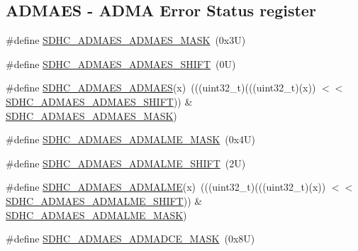 \subsection*{A\+D\+M\+A\+ES -\/ A\+D\+MA Error Status register}
\begin{DoxyCompactItemize}
\item 
\#define \mbox{\hyperlink{group___s_d_h_c___register___masks_gaaf2deb9a73e0aeecdc0ee08497d0165b}{S\+D\+H\+C\+\_\+\+A\+D\+M\+A\+E\+S\+\_\+\+A\+D\+M\+A\+E\+S\+\_\+\+M\+A\+SK}}~(0x3\+U)
\item 
\#define \mbox{\hyperlink{group___s_d_h_c___register___masks_ga3cc649f6ebd779dc84337a9bc5ae5c0d}{S\+D\+H\+C\+\_\+\+A\+D\+M\+A\+E\+S\+\_\+\+A\+D\+M\+A\+E\+S\+\_\+\+S\+H\+I\+FT}}~(0\+U)
\item 
\#define \mbox{\hyperlink{group___s_d_h_c___register___masks_gae961b07d5069efed1d1529e087caab7c}{S\+D\+H\+C\+\_\+\+A\+D\+M\+A\+E\+S\+\_\+\+A\+D\+M\+A\+ES}}(x)~(((uint32\+\_\+t)(((uint32\+\_\+t)(x)) $<$$<$ \mbox{\hyperlink{group___s_d_h_c___register___masks_ga3cc649f6ebd779dc84337a9bc5ae5c0d}{S\+D\+H\+C\+\_\+\+A\+D\+M\+A\+E\+S\+\_\+\+A\+D\+M\+A\+E\+S\+\_\+\+S\+H\+I\+FT}})) \& \mbox{\hyperlink{group___s_d_h_c___register___masks_gaaf2deb9a73e0aeecdc0ee08497d0165b}{S\+D\+H\+C\+\_\+\+A\+D\+M\+A\+E\+S\+\_\+\+A\+D\+M\+A\+E\+S\+\_\+\+M\+A\+SK}})
\item 
\#define \mbox{\hyperlink{group___s_d_h_c___register___masks_ga12cecea9616404f0ae9cae658e7c8849}{S\+D\+H\+C\+\_\+\+A\+D\+M\+A\+E\+S\+\_\+\+A\+D\+M\+A\+L\+M\+E\+\_\+\+M\+A\+SK}}~(0x4\+U)
\item 
\#define \mbox{\hyperlink{group___s_d_h_c___register___masks_ga75e811daac256a56735bf2a822440434}{S\+D\+H\+C\+\_\+\+A\+D\+M\+A\+E\+S\+\_\+\+A\+D\+M\+A\+L\+M\+E\+\_\+\+S\+H\+I\+FT}}~(2\+U)
\item 
\#define \mbox{\hyperlink{group___s_d_h_c___register___masks_ga401fe1b22794745f8c4e9ec0ee57560d}{S\+D\+H\+C\+\_\+\+A\+D\+M\+A\+E\+S\+\_\+\+A\+D\+M\+A\+L\+ME}}(x)~(((uint32\+\_\+t)(((uint32\+\_\+t)(x)) $<$$<$ \mbox{\hyperlink{group___s_d_h_c___register___masks_ga75e811daac256a56735bf2a822440434}{S\+D\+H\+C\+\_\+\+A\+D\+M\+A\+E\+S\+\_\+\+A\+D\+M\+A\+L\+M\+E\+\_\+\+S\+H\+I\+FT}})) \& \mbox{\hyperlink{group___s_d_h_c___register___masks_ga12cecea9616404f0ae9cae658e7c8849}{S\+D\+H\+C\+\_\+\+A\+D\+M\+A\+E\+S\+\_\+\+A\+D\+M\+A\+L\+M\+E\+\_\+\+M\+A\+SK}})
\item 
\#define \mbox{\hyperlink{group___s_d_h_c___register___masks_ga2c0005f89f635749f423284e92025434}{S\+D\+H\+C\+\_\+\+A\+D\+M\+A\+E\+S\+\_\+\+A\+D\+M\+A\+D\+C\+E\+\_\+\+M\+A\+SK}}~(0x8\+U)

\end{DoxyCompactItemize}
